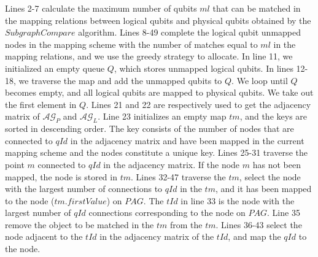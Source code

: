 \documentclass[runningheads]{llncs}
\begin{document}
Lines 2-7 calculate the maximum number of qubits $ml$ that can be matched in the mapping relations 
between logical qubits and physical qubits obtained by the $SubgraphCompare$ algorithm.
Lines 8-49 complete the logical qubit unmapped nodes in the mapping scheme with the number 
of matches equal to $ml$ in the mapping relations, and we use the greedy strategy to allocate.
In line 11, we initialized an empty queue $Q$, which stores unmapped logical qubits.
In lines 12-18, we traverse the map and add the unmapped qubits to $Q$.
We loop until $Q$ becomes empty, and all logical qubits are mapped to physical qubits.
We take out the first element in $Q$. 
Lines 21 and 22 are respectively used to get the adjacency matrix of $\mathcal{AG}_{P}$ and $\mathcal{AG}_{L}$. 
Line 23 initializes an empty map $tm$, and the keys are sorted in descending order. 
The key consists of the number of nodes that are connected to $qId$ in the adjacency 
matrix and have been mapped in the current mapping scheme and the nodes constitute a unique key.
Lines 25-31 traverse the point $m$ connected to $qId$ in the adjacency matrix. 
If the node $m$ has not been mapped, the node is stored in $tm$.
Lines 32-47 traverse the $tm$, select the node with the largest number of 
connections to $qId$ in the $tm$, and it has been mapped to the node ($tm.firstValue$) 
on $PAG$.
The $tId$ in line 33 is the node with the largest number of $qId$ connections 
corresponding to the node on $PAG$.
Line 35  remove the object to be matched in the $tm$ from the $tm$.
Lines 36-43  select the node adjacent to the $tId$ in the adjacency matrix of the $tId$, 
and map the $qId$ to the node.
\end{document}
